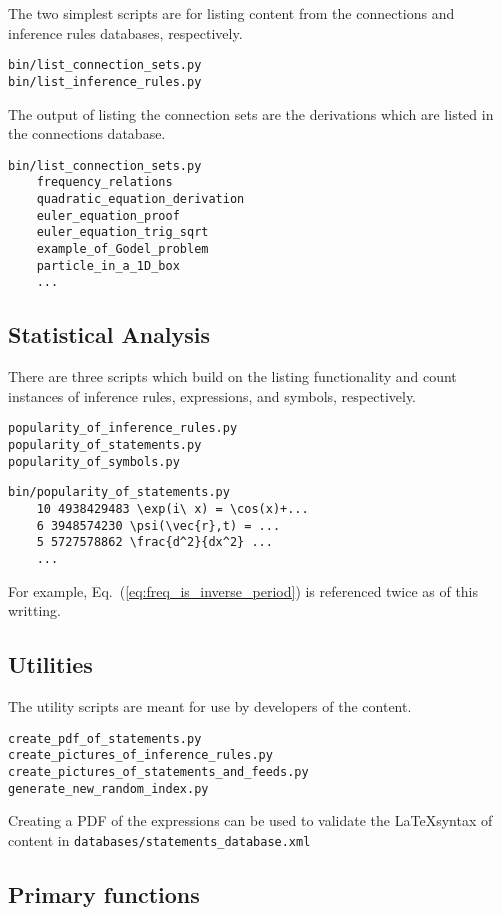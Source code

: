 \documentclass{article}
\newcommand{\eqn}[1]{Eq.\ (\ref{#1})}
\begin{document}
\begin{multicols}{2}
The two simplest scripts are for listing content from the connections and inference rules databases, respectively. 
\begin{verbatim}
bin/list_connection_sets.py
bin/list_inference_rules.py
\end{verbatim}

The output of listing the connection sets are the derivations which are listed in the connections database.
\begin{verbatim}
bin/list_connection_sets.py
    frequency_relations
    quadratic_equation_derivation
    euler_equation_proof
    euler_equation_trig_sqrt
    example_of_Godel_problem
    particle_in_a_1D_box
    ...
\end{verbatim}



\subsection{Statistical Analysis}
There are three scripts which build on the listing functionality and count instances of inference rules, expressions, and symbols, respectively. 
\begin{verbatim}
popularity_of_inference_rules.py
popularity_of_statements.py
popularity_of_symbols.py
\end{verbatim}

\begin{verbatim}
bin/popularity_of_statements.py
    10 4938429483 \exp(i\ x) = \cos(x)+...
    6 3948574230 \psi(\vec{r},t) = ...
    5 5727578862 \frac{d^2}{dx^2} ...
    ...
\end{verbatim}
For example, \eqn{eq:freq_is_inverse_period} is referenced twice as of this writting. 

\subsection{Utilities}
The utility scripts are meant for use by developers of the content. 
\begin{verbatim}
create_pdf_of_statements.py
create_pictures_of_inference_rules.py
create_pictures_of_statements_and_feeds.py
generate_new_random_index.py
\end{verbatim}
Creating a PDF of the expressions can be used to validate the \LaTeX syntax of content in \texttt{databases/statements\_database.xml}

\subsection{Primary functions}


\end{multicols}
\end{document}

